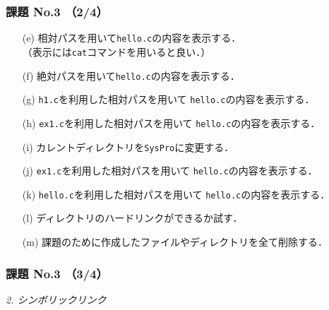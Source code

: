 \documentclass{beamer}                 %
\begin{document}
\begin{frame}[fragile]
  \frametitle{課題 No.3 （2/4）}
\begin{enumerate}
\item[(e)] 相対パスを用いて\texttt{hello.c}の内容を表示する．\\
（表示には\texttt{cat}コマンドを用いると良い．）
\item[(f)] 絶対パスを用いて\texttt{hello.c}の内容を表示する．
\item[(g)] \texttt{h1.c}を利用した相対パスを用いて
\texttt{hello.c}の内容を表示する．
\item[(h)] \texttt{ex1.c}を利用した相対パスを用いて
\texttt{hello.c}の内容を表示する．
\item[(i)] カレントディレクトリを\texttt{SysPro}に変更する．
\item[(j)] \texttt{ex1.c}を利用した相対パスを用いて
\texttt{hello.c}の内容を表示する．
\item[(k)] \texttt{hello.c}を利用した相対パスを用いて
\texttt{hello.c}の内容を表示する．
\item[(l)] ディレクトリのハードリンクができるか試す．
\item[(m)] 課題のために作成したファイルやディレクトリを全て削除する．
\end{enumerate}
\end{frame}

\begin{frame}[fragile]
  \frametitle{課題 No.3 （3/4）}
  \emph{2. シンボリックリンク}
\end{frame}
\end{document}
